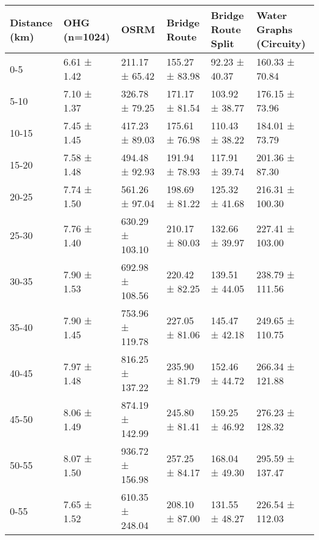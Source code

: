 \begin{tabular}{llllll}
\toprule
Distance (km) & OHG (n=1024) & OSRM & Bridge Route & Bridge Route Split & Water Graphs (Circuity) \\
\midrule
0-5 & 6.61 ± 1.42 & 211.17 ± 65.42 & 155.27 ± 83.98 & 92.23 ± 40.37 & 160.33 ± 70.84 \\
5-10 & 7.10 ± 1.37 & 326.78 ± 79.25 & 171.17 ± 81.54 & 103.92 ± 38.77 & 176.15 ± 73.96 \\
10-15 & 7.45 ± 1.45 & 417.23 ± 89.03 & 175.61 ± 76.98 & 110.43 ± 38.22 & 184.01 ± 73.79 \\
15-20 & 7.58 ± 1.48 & 494.48 ± 92.93 & 191.94 ± 78.93 & 117.91 ± 39.74 & 201.36 ± 87.30 \\
20-25 & 7.74 ± 1.50 & 561.26 ± 97.04 & 198.69 ± 81.22 & 125.32 ± 41.68 & 216.31 ± 100.30 \\
25-30 & 7.76 ± 1.40 & 630.29 ± 103.10 & 210.17 ± 80.03 & 132.66 ± 39.97 & 227.41 ± 103.00 \\
30-35 & 7.90 ± 1.53 & 692.98 ± 108.56 & 220.42 ± 82.25 & 139.51 ± 44.05 & 238.79 ± 111.56 \\
35-40 & 7.90 ± 1.45 & 753.96 ± 119.78 & 227.05 ± 81.06 & 145.47 ± 42.18 & 249.65 ± 110.75 \\
40-45 & 7.97 ± 1.48 & 816.25 ± 137.22 & 235.90 ± 81.79 & 152.46 ± 44.72 & 266.34 ± 121.88 \\
45-50 & 8.06 ± 1.49 & 874.19 ± 142.99 & 245.80 ± 81.41 & 159.25 ± 46.92 & 276.23 ± 128.32 \\
50-55 & 8.07 ± 1.50 & 936.72 ± 156.98 & 257.25 ± 84.17 & 168.04 ± 49.30 & 295.59 ± 137.47 \\
0-55 & 7.65 ± 1.52 & 610.35 ± 248.04 & 208.10 ± 87.00 & 131.55 ± 48.27 & 226.54 ± 112.03 \\
\bottomrule
\end{tabular}
